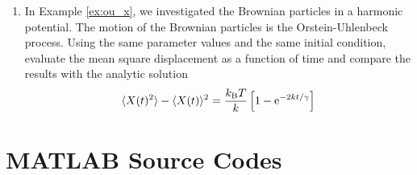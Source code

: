\begin{enumerate}[labelwidth=0.5cm,labelindent=0cm,leftmargin=*,label=\bfseries \thechapter.\arabic*,align=left]
\item
In Example \ref{ex:ou_x}, we investigated the Brownian particles in a harmonic potential.  The motion of the Brownian particles is the Orstein-Uhlenbeck process.  Using the same parameter values and the same initial condition, evaluate the mean square displacement as a function of time and compare the results with the analytic solution
\begin{equation}
 \langle X(t)^2 \rangle-\langle X(t) \rangle^2 = \frac{k_\text{B} T}{k} \left [ 1 - \text{e}^{-2 k t /\gamma} \right ]  
\end{equation}

\end{enumerate}

\newpage
\noindent
\section*{MATLAB Source Codes}

